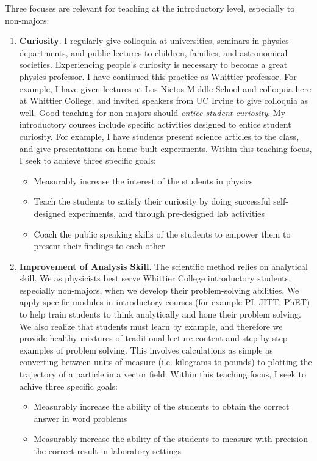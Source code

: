 \documentclass[../../main.tex]{subfiles}
\begin{document}
Three focuses are relevant for teaching at the introductory level, especially to non-majors:
\begin{enumerate}
\item \textbf{Curiosity}.  I regularly give colloquia at universities, seminars in physics departments, and public lectures to children, families, and astronomical societies.  Experiencing people's curiosity is necessary to become a great physics professor.  I have continued this practice as Whittier professor.  For example, I have given lectures at Los Nietos Middle School and colloquia here at Whittier College, and invited speakers from UC Irvine to give colloquia as well.  Good teaching for non-majors should \textit{entice student curiosity}.  My introductory courses include specific activities designed to entice student curiosity.  For example, I have students present science articles to the class, and give presentations on home-built experiments.  Within this teaching focus, I seek to achieve three specific goals:

\begin{itemize}
\item Measurably increase the interest of the students in physics %
\item Teach the students to satisfy their curiosity by doing successful self-designed experiments, and through pre-designed lab activities %
\item Coach the public speaking skills of the students to empower them to present their findings to each other %
\end{itemize}

\item \textbf{Improvement of Analysis Skill}.  The scientific method relies on analytical skill.  We as physicists best serve Whittier College introductory students, especially non-majors, when we develop their problem-solving abilities.  We apply specific modules in introductory courses (for example PI, JITT, PhET) to help train students to think analytically and hone their problem solving.  We also realize that students must learn by example, and therefore we provide healthy mixtures of traditional lecture content and step-by-step examples of problem solving.  This involves calculations as simple as converting between units of measure (i.e. kilograms to pounds) to plotting the trajectory of a particle in a vector field.  Within this teaching focus, I seek to achive three specific goals:

\begin{itemize}
\item Measurably increase the ability of the students to obtain the correct answer in word problems %
\item Measurably increase the ability of the students to measure with precision the correct result in laboratory settings 
\end{itemize}


\end{enumerate}
\end{document}
